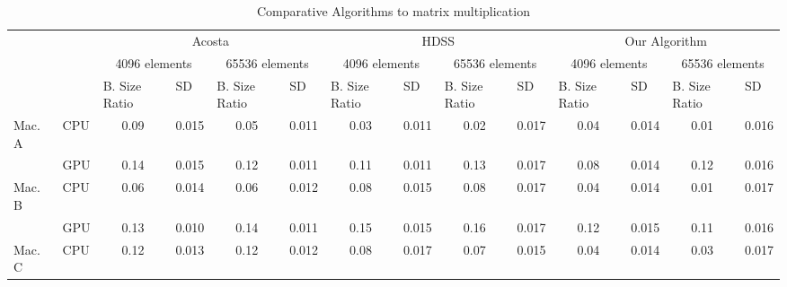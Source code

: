\documentclass[journal]{IEEEtran}
\begin{document}
\begin{table}[htb]
\centering
\caption{Comparative Algorithms to matrix multiplication}
\begin{scriptsize}
\begin{tabular}{|l|l|l|l|l|l|l|l|l|l|l|l|l|l|}
\cline{3-14}
\multicolumn{1}{l}{} &  & \multicolumn{4}{c|}{Acosta} & \multicolumn{4}{c|}{HDSS} & \multicolumn{4}{c|}{Our Algorithm} \\ 
\cline{3-14}
\multicolumn{1}{l}{} &  & \multicolumn{2}{c|}{4096 elements} & \multicolumn{2}{c|}{65536 elements} & \multicolumn{2}{c|}{4096 elements} & \multicolumn{2}{c|}{65536 elements} & \multicolumn{2}{c|}{4096 elements} & \multicolumn{2}{c|}{65536 elements} \\ 
\cline{3-14}
\multicolumn{1}{l}{} &  & B. Size Ratio & SD & B. Size Ratio & SD & B. Size Ratio & SD & B. Size Ratio & SD & B. Size Ratio & SD & B. Size Ratio & SD \\ 
\hline
Mac. A & CPU & \multicolumn{1}{c|}{0.09} & \multicolumn{1}{c|}{0.015} & \multicolumn{1}{c|}{0.05} & \multicolumn{1}{c|}{0.011} & \multicolumn{1}{c|}{0.03} & \multicolumn{1}{c|}{0.011} & \multicolumn{1}{c|}{0.02} & \multicolumn{1}{c|}{0.017} & \multicolumn{1}{c|}{0.04} & \multicolumn{1}{c|}{0.014} & \multicolumn{1}{c|}{0.01} & \multicolumn{1}{c|}{0.016} \\ 
\cline{2-14}
 & GPU & \multicolumn{1}{c|}{0.14} & \multicolumn{1}{c|}{0.015} & \multicolumn{1}{c|}{0.12} & \multicolumn{1}{c|}{0.011} & \multicolumn{1}{c|}{0.11} & \multicolumn{1}{c|}{0.011} & \multicolumn{1}{c|}{0.13} & \multicolumn{1}{c|}{0.017} & \multicolumn{1}{c|}{0.08} & \multicolumn{1}{c|}{0.014} & \multicolumn{1}{c|}{0.12} & \multicolumn{1}{c|}{0.016} \\ 
\hline
Mac. B & CPU & \multicolumn{1}{c|}{0.06} & \multicolumn{1}{c|}{0.014} & \multicolumn{1}{c|}{0.06} & \multicolumn{1}{c|}{0.012} & \multicolumn{1}{c|}{0.08} & \multicolumn{1}{c|}{0.015} & \multicolumn{1}{c|}{0.08} & \multicolumn{1}{c|}{0.017} & \multicolumn{1}{c|}{0.04} & \multicolumn{1}{c|}{0.014} & \multicolumn{1}{c|}{0.01} & \multicolumn{1}{c|}{0.017} \\ 
\cline{2-14}
 & GPU & \multicolumn{1}{c|}{0.13} & \multicolumn{1}{c|}{0.010} & \multicolumn{1}{c|}{0.14} & \multicolumn{1}{c|}{0.011} & \multicolumn{1}{c|}{0.15} & \multicolumn{1}{c|}{0.015} & \multicolumn{1}{c|}{0.16} & \multicolumn{1}{c|}{0.017} & \multicolumn{1}{c|}{0.12} & \multicolumn{1}{c|}{0.015} & \multicolumn{1}{c|}{0.11} & \multicolumn{1}{c|}{0.016} \\ 
\hline
Mac. C & CPU & \multicolumn{1}{c|}{0.12} & \multicolumn{1}{c|}{0.013} & \multicolumn{1}{c|}{0.12} & \multicolumn{1}{c|}{0.012} & \multicolumn{1}{c|}{0.08} & \multicolumn{1}{c|}{0.017} & \multicolumn{1}{c|}{0.07} & \multicolumn{1}{c|}{0.015} & \multicolumn{1}{c|}{0.04} & \multicolumn{1}{c|}{0.014} & \multicolumn{1}{c|}{0.03} & \multicolumn{1}{c|}{0.017} \\ 

\end{tabular}
\end{scriptsize}
\end{table}
\end{document}
